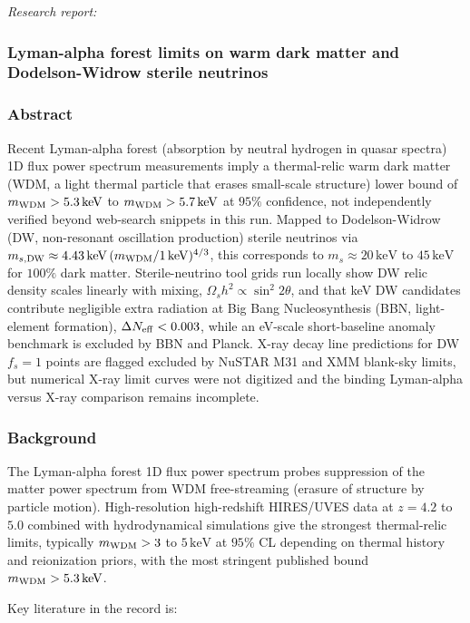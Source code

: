 \documentclass[11pt,a4paper]{article}
\begin{document}
\textit{Research report:}\par
\subsubsection*{Lyman-alpha forest limits on warm dark matter and Dodelson-Widrow sterile neutrinos}
\subsubsection*{Abstract}
Recent Lyman-alpha forest (absorption by neutral hydrogen in quasar spectra) 1D flux power spectrum measurements imply a thermal-relic warm dark matter (WDM, a light thermal particle that erases small-scale structure) lower bound of $m_{\rm WDM} > 5.3\,\mathrm{keV}$ to $m_{\rm WDM} > 5.7\,\mathrm{keV}$ at $95\%$ confidence, not independently verified beyond web-search snippets in this run. Mapped to Dodelson-Widrow (DW, non-resonant oscillation production) sterile neutrinos via $m_{s,{\rm DW}} \approx 4.43\,\mathrm{keV}\,(m_{\rm WDM}/1\,\mathrm{keV})^{4/3}$, this corresponds to $m_s \approx 20\,\mathrm{keV}$ to $45\,\mathrm{keV}$ for $100\%$ dark matter. Sterile-neutrino tool grids run locally show DW relic density scales linearly with mixing, $\Omega_s h^2 \propto \sin^2 2\theta$, and that keV DW candidates contribute negligible extra radiation at Big Bang Nucleosynthesis (BBN, light-element formation), $\Delta N_{\rm eff} < 0.003$, while an eV-scale short-baseline anomaly benchmark is excluded by BBN and Planck. X-ray decay line predictions for DW $f_s=1$ points are flagged excluded by NuSTAR M31 and XMM blank-sky limits, but numerical X-ray limit curves were not digitized and the binding Lyman-alpha versus X-ray comparison remains incomplete.

\subsubsection*{Background}
The Lyman-alpha forest 1D flux power spectrum probes suppression of the matter power spectrum from WDM free-streaming (erasure of structure by particle motion). High-resolution high-redshift HIRES/UVES data at $z = 4.2$ to $5.0$ combined with hydrodynamical simulations give the strongest thermal-relic limits, typically $m_{\rm WDM} > 3$ to $5\,\mathrm{keV}$ at $95\%$ CL depending on thermal history and reionization priors, with the most stringent published bound $m_{\rm WDM} > 5.3\,\mathrm{keV}$.

Key literature in the record is:
\end{document}
